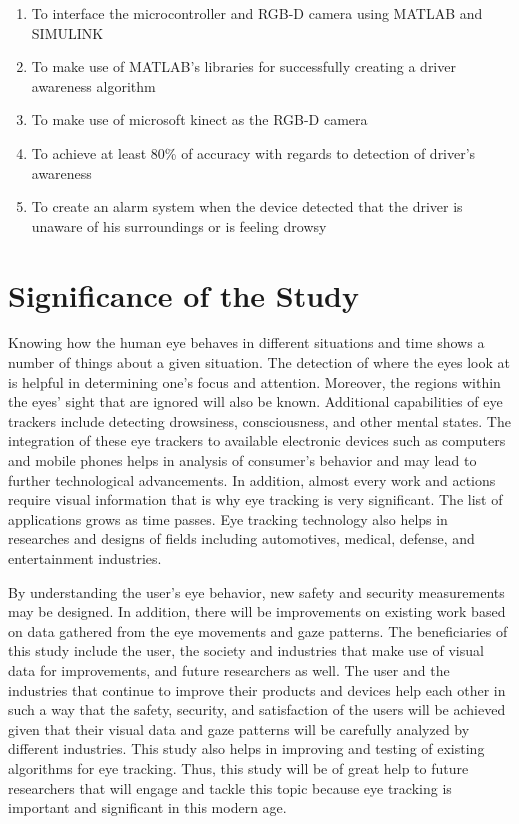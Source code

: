 \begin{enumerate}
	
	\item To interface the microcontroller and RGB-D camera using MATLAB and SIMULINK
	
	\item To make use of MATLAB’s libraries for successfully creating a driver awareness algorithm 
	
	\item To make use of microsoft kinect as the RGB-D camera
	
	\item To achieve at least 80\% of accuracy with regards to detection of driver’s awareness
	
	\item To create an alarm system when the device detected that the driver is unaware of his surroundings or is feeling drowsy
	
\end{enumerate}



\section{Significance of the Study}

Knowing how the human eye behaves in different situations and time shows a number of things about a given situation. The detection of where the eyes look at is helpful in determining one’s focus and attention. Moreover, the regions within the eyes’ sight that are ignored will also be known. Additional capabilities of eye trackers include detecting drowsiness, consciousness, and other mental states. The integration of these eye trackers to available electronic devices such as computers and mobile phones helps in analysis of consumer’s behavior and may lead to further technological advancements. In addition, almost every work and actions require visual information that is why eye tracking is very significant. The list of applications grows as time passes. Eye tracking technology also helps in researches and designs of fields including automotives, medical, defense, and entertainment industries. 

By understanding the user’s eye behavior, new safety and security measurements may be designed. In addition, there will be improvements on existing work based on data gathered from the eye movements and gaze patterns. The beneficiaries of this study include the user, the society and industries that make use of visual data for improvements, and future researchers as well. The user and the industries that continue to improve their products and devices help each other in such a way that the safety, security, and satisfaction of the users will be achieved given that their visual data and gaze patterns will be carefully analyzed by different industries. This study also helps in improving and testing of existing algorithms for eye tracking. Thus, this study will be of great help to future researchers that will engage and tackle this topic because eye tracking is important and significant in this modern age. 




